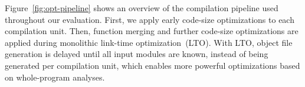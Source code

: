 Figure~\ref{fig:opt-pipeline} shows an overview of the compilation pipeline used
throughout our evaluation.
First, we apply early code-size optimizations to each compilation unit.
Then, function merging and further code-size optimizations are applied during
monolithic link-time optimization~(LTO).
With LTO, object file generation is delayed until all input modules are known,
instead of being generated per compilation unit, which enables more powerful
optimizations based on whole-program analyses.
